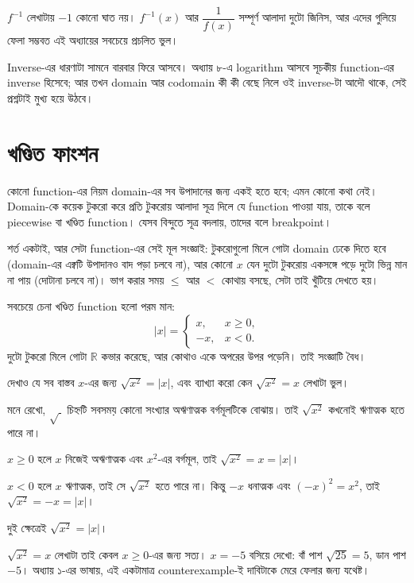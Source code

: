 \documentclass[11pt]{article}
\begin{document}
\begin{remark}
$f^{-1}$ লেখাটায় $-1$ কোনো ঘাত নয়। $f^{-1}(x)$ আর $\dfrac{1}{f(x)}$ সম্পূর্ণ
আলাদা দুটো জিনিস, আর এদের গুলিয়ে ফেলা সম্ভবত এই অধ্যায়ের সবচেয়ে
প্রচলিত ভুল।

Inverse-এর ধারণাটা সামনে বারবার ফিরে আসবে। অধ্যায় ৮-এ logarithm আসবে সূচকীয় function-এর inverse হিসেবে; আর তখন domain আর codomain কী কী
বেছে নিলে ওই inverse-টা আদৌ থাকে, সেই প্রশ্নটাই মুখ্য হয়ে উঠবে।
\end{remark}

\section{খণ্ডিত ফাংশন}

\begin{idea}[খণ্ডিত ফাংশন]
কোনো function-এর নিয়ম domain-এর সব উপাদানের জন্য একই হতে হবে; এমন কোনো কথা নেই।
Domain-কে কয়েক টুকরো করে প্রতি টুকরোয় আলাদা সূত্র দিলে যে function পাওয়া যায়,
তাকে বলে piecewise বা খণ্ডিত function। যেসব বিন্দুতে সূত্র বদলায়, তাদের বলে
breakpoint।

শর্ত একটাই, আর সেটা function-এর সেই মূল সংজ্ঞাই: টুকরোগুলো মিলে গোটা domain
ঢেকে দিতে হবে (domain-এর এক্বটি উপাদানও বাদ পড়া চলবে না), আর কোনো $x$ যেন দুটো টুকরোয় একসঙ্গে পড়ে
দুটো ভিন্ন মান না পায় (দোটানা চলবে না)। ভাগ করার সময় $\leq$ আর $<$ কোথায়
বসছে, সেটা তাই খুঁটিয়ে দেখতে হয়।
\end{idea}

\begin{idea}[পরম মান]
সবচেয়ে চেনা খণ্ডিত function হলো পরম মান:
\[
  |x| =
  \begin{cases}
    x, & x \geq 0, \\[2pt]
    -x, & x < 0 .
  \end{cases}
\]
দুটো টুকরো মিলে গোটা $\mathbb{R}$ কভার করেছে, আর কোথাও একে অপরের উপর পড়েনি।
তাই সংজ্ঞাটি বৈধ।
\end{idea}

\begin{example}
দেখাও যে সব বাস্তব $x$-এর জন্য $\sqrt{x^2} = |x|$, এবং ব্যাখ্যা করো কেন
$\sqrt{x^2} = x$ লেখাটা ভুল।
\end{example}

\begin{solbox}
মনে রেখো, $\sqrt{\ }$ চিহ্নটি সবসময় কোনো সংখ্যার অঋণাত্মক বর্গমূলটিকে বোঝায়। তাই
$\sqrt{x^2}$ কখনোই ঋণাত্মক হতে পারে না।

$x \geq 0$ হলে $x$ নিজেই অঋণাত্মক এবং $x^2$-এর বর্গমূল, তাই
$\sqrt{x^2} = x = |x|$।

$x < 0$ হলে $x$ ঋণাত্মক, তাই সে $\sqrt{x^2}$ হতে পারে না। কিন্তু $-x$
ধনাত্মক এবং $(-x)^2 = x^2$, তাই $\sqrt{x^2} = -x = |x|$।

দুই ক্ষেত্রেই $\sqrt{x^2} = |x|$।

$\sqrt{x^2} = x$ লেখাটা তাই কেবল $x \geq 0$-এর জন্য সত্য। $x = -5$ বসিয়ে
দেখো: বাঁ পাশ $\sqrt{25} = 5$, ডান পাশ $-5$। অধ্যায় ১-এর ভাষায়, এই
একটামাত্র counterexample-ই দাবিটাকে মেরে ফেলার জন্য যথেষ্ট।
\end{solbox}
\end{document}
